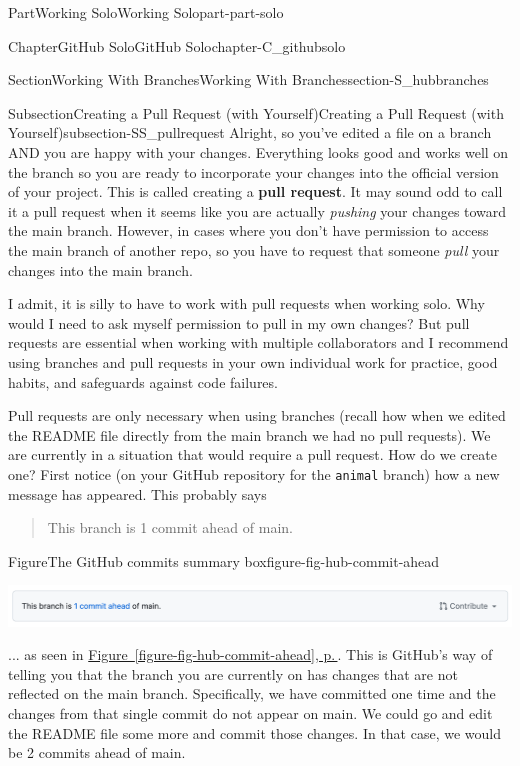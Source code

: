 \documentclass[twoside,10pt,]{book}
\newcommand{\xreffont}{\relax}
\newcommand{\mono}[1]{\texttt{#1}}
\newcommand{\terminology}[1]{\textbf{#1}}
\begin{document}
\begin{partptx}{Part}{Working Solo}{}{Working Solo}{}{}{part-part-solo}
\begin{chapterptx}{Chapter}{GitHub Solo}{}{GitHub Solo}{}{}{chapter-C_githubsolo}
\begin{sectionptx}{Section}{Working With Branches}{}{Working With Branches}{}{}{section-S_hubbranches}
\typeout{************************************************}
%
\begin{subsectionptx}{Subsection}{Creating a Pull Request (with Yourself)}{}{Creating a Pull Request (with Yourself)}{}{}{subsection-SS_pullrequest}
%
%
%
%
Alright, so you've edited a file on a branch AND you are happy with your changes. Everything looks good and works well on the branch so you are ready to incorporate your changes into the official version of your project. This is called creating a \terminology{pull request}. It may sound odd to call it a pull request when it seems like you are actually \emph{pushing} your changes toward the main branch. However, in cases where you don't have permission to access the main branch of another repo, so you have to request that someone \emph{pull} your changes into the main branch.%
\par
I admit, it is silly to have to work with pull requests when working solo. Why would I need to ask myself permission to pull in my own changes? But pull requests are essential when working with multiple collaborators and I recommend using branches and pull requests in your own individual work for practice, good habits, and safeguards against code failures.%
\par
{} Pull requests are only necessary when using branches (recall how when we edited the README file directly from the main branch we had no pull requests). We are currently in a situation that would require a pull request. How do we create one? First notice (on your GitHub repository for the \mono{animal} branch) how a new message has appeared. This probably says%
\begin{quote}%
This branch is 1 commit ahead of main.%
\end{quote}
\begin{figureptx}{Figure}{The GitHub commits summary box}{figure-fig-hub-commit-ahead}{}%
\begin{image}{0.05}{0.9}{0.05}{}%
\includegraphics[width=\linewidth]{external/hub_commit_ahead.pdf}
\end{image}%
\tcblower
\end{figureptx}%
... as seen in \hyperref[figure-fig-hub-commit-ahead]{Figure~{\xreffont\ref{figure-fig-hub-commit-ahead}}, p.\,\pageref{figure-fig-hub-commit-ahead}}. This is GitHub's way of telling you that the branch you are currently on has changes that are not reflected on the main branch. Specifically, we have committed one time and the changes from that single commit do not appear on main. We could go and edit the README file some more and commit those changes. In that case, we would be 2 commits ahead of main.%

\end{subsectionptx}
\end{sectionptx}
\end{chapterptx}
\end{partptx}
\end{document}
